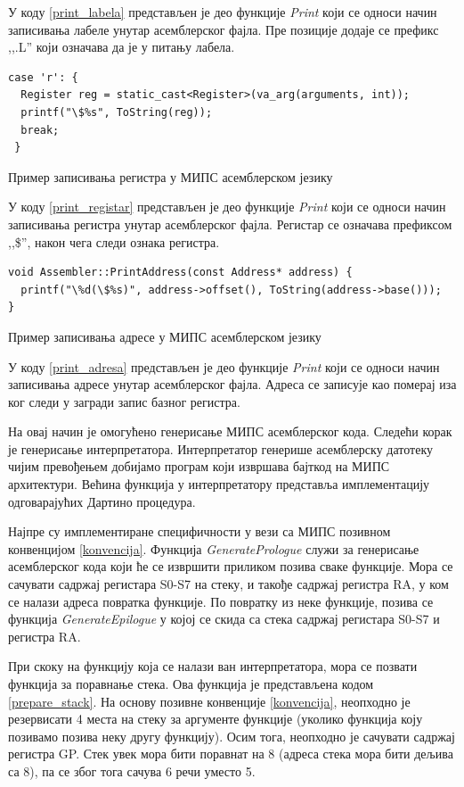\documentclass[12pt,oneside]{memoir}
\begin{document}
У коду \ref{print_labela} представљен је део функције \textit{Print} који се односи начин записивања лабеле унутар асемблерског фајла. Пре позиције додаје се префикс ,,.L'' који означава да је у питању лабела.

\begin{listing}
\begin{verbatim}
case 'r': {
  Register reg = static_cast<Register>(va_arg(arguments, int));
  printf("\$%s", ToString(reg));
  break;
 }
\end{verbatim}
\caption{Пример записивања регистра у МИПС асемблерском језику}
\label{print_registar}
\end{listing}
У коду \ref{print_registar} представљен је део функције \textit{Print} који се односи начин записивања регистра унутар асемблерског фајла. Регистар се означава префиксом ,,\$'', након чега следи ознака регистра.

\begin{listing}
\begin{verbatim}
void Assembler::PrintAddress(const Address* address) {
  printf("\%d(\$%s)", address->offset(), ToString(address->base()));
}
\end{verbatim}
\caption{Пример записивања адресе у МИПС асемблерском језику}
\label{print_adresa}
\end{listing}
У коду \ref{print_adresa} представљен је део функције \textit{Print} који се односи начин записивања адресе унутар асемблерског фајла. Адреса се записује као померај иза ког следи у загради запис базног регистра.


На овај начин је омогућено генерисање МИПС асемблерског кода. Следећи корак је генерисање интерпретатора. Интерпретатор генерише асемблерску датотеку чијим превођењем добијамо програм који извршава бајткод на МИПС архитектури. Већина функција у интерпретатору представља имплементацију одговарајућих Дартино процедура.

Најпре су имплементиране специфичности у вези са МИПС позивном конвенцијом \ref{konvencija}. Функција \textit{GeneratePrologue} служи за генерисање асемблерског кода који ће се извршити приликом позива сваке  функције. Мора се сачувати садржај регистара S0-S7 на стеку, и такође садржај регистра RA, у ком се налази адреса повратка функције. По повратку из неке функције, позива се функција \textit{GenerateEpilogue} у којој се скида са стека садржај регистара S0-S7 и регистра RA.

При скоку на функцију која се налази ван интерпретатора, мора се позвати функција за поравнање стека. Ова функција је представљена кодом \ref{prepare_stack}.
На основу позивне конвенције \ref{konvencija}, неопходно је резервисати 4 места на стеку за аргументе функције (уколико функција коју позивамо позива неку другу функцију). Осим тога, неопходно је сачувати садржај регистра GP. Стек увек мора бити поравнат на 8 (адреса стека мора бити дељива са 8), па се због тога сачува 6 речи уместо 5.\\
\end{document}
